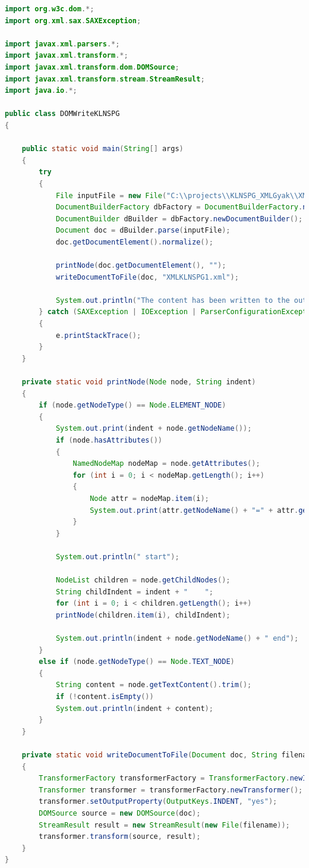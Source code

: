\documentclass[12pt]{report}
\begin{document}
\begin{lstlisting}[caption={DOMWriteKLNSPG.java} olvasó program, language=Java]
import org.w3c.dom.*;
import org.xml.sax.SAXException;

import javax.xml.parsers.*;
import javax.xml.transform.*;
import javax.xml.transform.dom.DOMSource;
import javax.xml.transform.stream.StreamResult;
import java.io.*;

public class DOMWriteKLNSPG
{
	
	public static void main(String[] args)
	{
		try 
		{
			File inputFile = new File("C:\\projects\\KLNSPG_XMLGyak\\XMLTaskKLNSPG\\XMLKLNSPG.xml");
			DocumentBuilderFactory dbFactory = DocumentBuilderFactory.newInstance();
			DocumentBuilder dBuilder = dbFactory.newDocumentBuilder();
			Document doc = dBuilder.parse(inputFile);
			doc.getDocumentElement().normalize();
			
			printNode(doc.getDocumentElement(), "");
			writeDocumentToFile(doc, "XMLKLNSPG1.xml");
			
			System.out.println("The content has been written to the output file successfully.");
		} catch (SAXException | IOException | ParserConfigurationException | TransformerException e) 
		{
			e.printStackTrace();
		}
	}
	
	private static void printNode(Node node, String indent) 
	{
		if (node.getNodeType() == Node.ELEMENT_NODE) 
		{
			System.out.print(indent + node.getNodeName());
			if (node.hasAttributes()) 
			{
				NamedNodeMap nodeMap = node.getAttributes();
				for (int i = 0; i < nodeMap.getLength(); i++) 
				{
					Node attr = nodeMap.item(i);
					System.out.print(attr.getNodeName() + "=" + attr.getNodeValue() + (i < nodeMap.getLength() - 1 ? ", " : ""));
				}
			}
			
			System.out.println(" start");
			
			NodeList children = node.getChildNodes();
			String childIndent = indent + "    ";
			for (int i = 0; i < children.getLength(); i++) 
			printNode(children.item(i), childIndent);
			
			System.out.println(indent + node.getNodeName() + " end");
		} 
		else if (node.getNodeType() == Node.TEXT_NODE) 
		{
			String content = node.getTextContent().trim();
			if (!content.isEmpty()) 
			System.out.println(indent + content);
		}
	}
	
	private static void writeDocumentToFile(Document doc, String filename) throws TransformerException 
	{
		TransformerFactory transformerFactory = TransformerFactory.newInstance();
		Transformer transformer = transformerFactory.newTransformer();
		transformer.setOutputProperty(OutputKeys.INDENT, "yes");
		DOMSource source = new DOMSource(doc);
		StreamResult result = new StreamResult(new File(filename));
		transformer.transform(source, result);
	}
}
\end{lstlisting}
\end{document}
